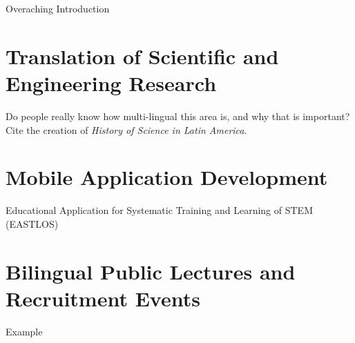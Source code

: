 \documentclass[../../main.tex]{subfiles}
\begin{document}
Overaching Introduction

\section{Translation of Scientific and Engineering Research}

Do people really know how multi-lingual this area is, and why that is important?  Cite the creation of \textit{History of Science in Latin America}.

\section{Mobile Application Development}

Educational Application for Systematic Training and Learning of STEM (EASTLOS)

\section{Bilingual Public Lectures and Recruitment Events}

Example
\end{document}
